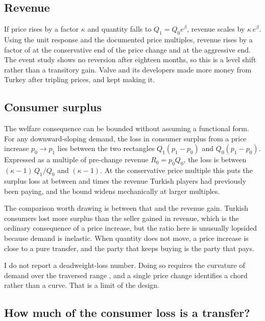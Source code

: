 \documentclass[11pt]{article}
\begin{document}
\subsection{Revenue}

If price rises by a factor $\kappa$ and quantity falls to $Q_1 = Q_0 e^{\beta}$, revenue scales by
$\kappa\,e^{\beta}$. Using the unit response and the documented price multiples, revenue rises by a
factor of \revMultLo{} at the conservative end of the price change and \revMultHi{} at the
aggressive end. The event study shows no reversion after eighteen months, so this is a level shift
rather than a transitory gain. Valve and its developers made more money from Turkey after tripling
prices, and kept making it.

\subsection{Consumer surplus}

The welfare consequence can be bounded without assuming a functional form. For any downward-sloping
demand, the loss in consumer surplus from a price increase $p_0 \to p_1$ lies between the two
rectangles $Q_1(p_1-p_0)$ and $Q_0(p_1-p_0)$. Expressed as a multiple of pre-change revenue
$R_0 = p_0 Q_0$, the loss is between $(\kappa-1)\,Q_1/Q_0$ and $(\kappa-1)$. At the conservative
price multiple this puts the surplus loss at between \csLossLo{} and \csLossHi{} times the revenue
Turkish players had previously been paying, and the bound widens mechanically at larger multiples.

The comparison worth drawing is between that and the revenue gain. Turkish consumers lost more
surplus than the seller gained in revenue, which is the ordinary consequence of a price increase,
but the ratio here is unusually lopsided because demand is inelastic. When quantity does
not move, a price increase is close to a pure transfer, and the party that keeps buying is the
party that pays.

I do not report a deadweight-loss number. Doing so requires the curvature of demand over the
traversed range \citep{schmalensee1981,varian1985,aguirre2010}, and a single price change
identifies a chord rather than a curve. That is a limit of the design.

\subsection{How much of the consumer loss is a transfer?}
\end{document}
